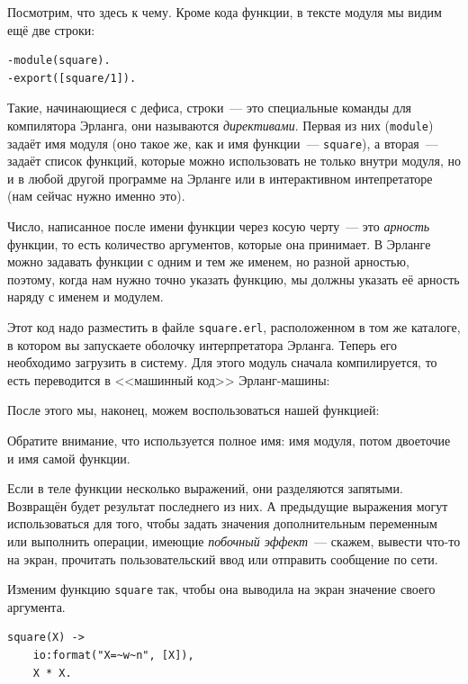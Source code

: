 \documentclass[
  paper=a4,
  fontsize=14pt,
  openany,
  appendixprefix=true
]{scrbook}
\begin{document}
Посмотрим, что здесь к чему. Кроме кода функции, в тексте модуля мы видим ещё две строки:

\begin{lstlisting}
-module(square).
-export([square/1]).
\end{lstlisting}

Такие, начинающиеся с дефиса, строки~--- это специальные команды для компилятора Эрланга, они называются \emph{директивами}. Первая из них (\lstinline{module}) задаёт имя модуля (оно такое же, как и имя функции~--- \lstinline{square}), а вторая~--- задаёт список функций, которые можно использовать не только внутри модуля, но и в любой другой программе на Эрланге или в интерактивном интепретаторе (нам сейчас нужно именно это).

Число, написанное после имени функции через косую черту~--- это \emph{арность} функции, то есть количество аргументов, которые она принимает. В Эрланге можно задавать функции с одним и тем же именем, но разной арностью, поэтому, когда нам нужно точно указать функцию, мы должны указать её арность наряду с именем и модулем.


Этот код надо разместить в файле \lstinline{square.erl}, расположенном в том же каталоге, в котором вы запускаете оболочку интерпретатора Эрланга. Теперь его необходимо загрузить в систему. Для этого модуль сначала компилируется, то есть переводится в <<машинный код>> Эрланг-машины:

После этого мы, наконец, можем воспользоваться нашей функцией:

Обратите внимание, что используется полное имя: имя модуля, потом двоеточие и имя самой функции.

Если в теле функции несколько выражений, они разделяются запятыми. Возвращён будет результат последнего из них. А предыдущие выражения могут использоваться для того, чтобы задать значения дополнительным переменным или выполнить операции, имеющие \emph{побочный эффект}~--- скажем, вывести что-то на экран, прочитать пользовательский ввод или отправить сообщение по сети.

Изменим функцию \lstinline{square} так, чтобы она выводила на экран значение своего аргумента.

\begin{lstlisting}
square(X) ->
    io:format("X=~w~n", [X]),
    X * X.
\end{lstlisting}
\end{document}
